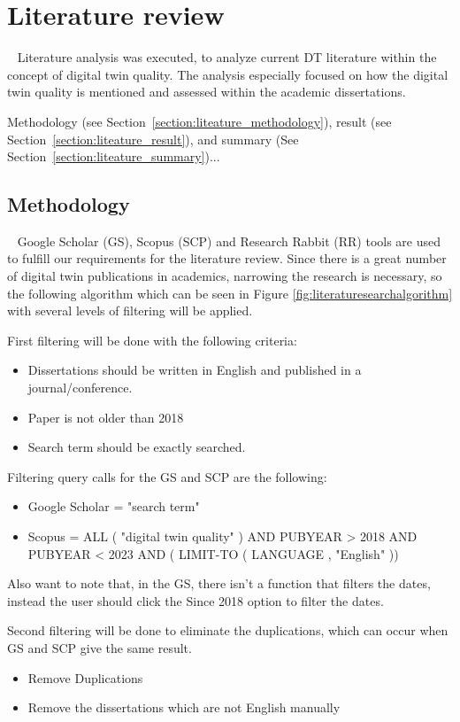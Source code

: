 \documentclass[9pt,conference]{IEEEtran}
\begin{document}
    \section{Literature review}~\label{section: literature}
    Literature analysis was executed, to analyze current DT literature within the concept of digital twin quality. The analysis especially focused on 
    how the digital twin quality is mentioned and assessed within the academic dissertations.

    Methodology (see Section~\ref{section:liteature_methodology}), result (see Section~\ref{section:liteature_result}), and summary (See Section~\ref{section:liteature_summary})...
    \subsection{Methodology}~\label{section:liteature_methodology}
    Google Scholar (GS), Scopus (SCP) and Research Rabbit (RR) tools are used to fulfill our requirements for the literature review. 
    Since there is a great number of digital twin publications in academics, 
    narrowing the research is necessary, so the following algorithm which can be seen in Figure \ref{fig:literaturesearchalgorithm} with several levels of filtering will be applied.
    
    First filtering will be done with the following criteria:
    \begin{itemize}
        \item Dissertations should be written in English and published in a journal/conference.
        \item Paper is not older than 2018
        \item Search term should be exactly searched.
    \end{itemize}

   
    Filtering query calls for the GS and SCP are the following:
    \begin{itemize}
        \item Google Scholar = "search term"
        \item Scopus = ALL ( "digital twin quality" ) AND PUBYEAR > 2018 AND PUBYEAR < 2023 AND ( LIMIT-TO ( LANGUAGE , "English" )) 
    \end{itemize} 

    Also want to note that, in the GS, there isn't a function that filters the dates, instead the user should click the Since 2018 option to filter the dates.


    Second filtering will be done to eliminate the duplications, which can occur when GS and SCP give the same result.
    \begin{itemize}
        \item Remove Duplications
        \item Remove the dissertations which are not English manually
    \end{itemize}  
    
\end{document}
